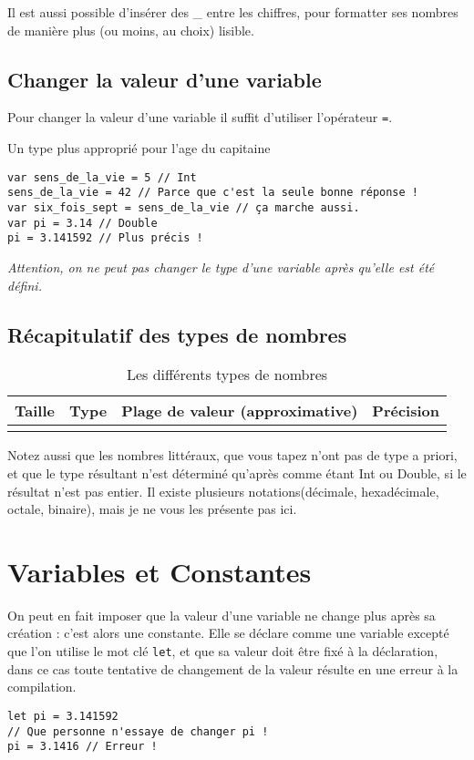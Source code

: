 Il est aussi possible d'insérer des \_ entre les chiffres, pour formatter ses nombres de manière plus (ou moins, au choix) lisible.

\subsection{Changer la valeur d'une variable}
Pour changer la valeur d'une variable il suffit d'utiliser l'opérateur \verb"=".
\begin{listing}[h]
\caption{Un type plus approprié pour l'age du capitaine}
\begin{verbatim}
var sens_de_la_vie = 5 // Int
sens_de_la_vie = 42 // Parce que c'est la seule bonne réponse !
var six_fois_sept = sens_de_la_vie // ça marche aussi.
var pi = 3.14 // Double
pi = 3.141592 // Plus précis !
\end{verbatim}
\end{listing}

\emph{Attention, on ne peut pas changer le type d'une variable après qu'elle est été défini.}
\subsection{Récapitulatif des types de nombres}
\begin{longtabu} to \linewidth {|X[2,l,m]|X[1,l,m]|X[4,r,m]|X[2,r,m]|}
\hline Taille & Type & Plage de valeur (approximative) & Précision \\ \hline
\endhead


\caption{Les différents types de nombres}
\end{longtabu}
Notez aussi que les nombres littéraux, que vous tapez n'ont pas de type a priori, et que le type résultant n'est déterminé qu'après comme étant Int ou Double, si le résultat n'est pas entier. Il existe plusieurs notations(décimale, hexadécimale, octale, binaire), mais je ne vous les présente pas ici.
\section{Variables et Constantes}
On peut en fait imposer que la valeur d'une variable ne change plus après sa création :
c'est alors une constante. Elle se déclare comme une variable excepté que l'on utilise le
mot clé \texttt{let}, et que sa valeur doit être fixé à la déclaration, dans ce cas toute tentative de changement de la valeur résulte en une erreur à la compilation.
\begin{listing}[h]
\begin{verbatim}
let pi = 3.141592
// Que personne n'essaye de changer pi !
pi = 3.1416 // Erreur !
\end{verbatim}
\end{listing}

